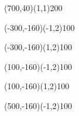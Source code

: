 \documentclass[12pt]{article}
\begin{document}
\begin{figure}[htb]
\begin{egame}
\putbranch(700,40)(1,1){200}

\renewcommand{\egarrowstyle}{e}

\putbranch(-300,-160)(-1,2){100}

\renewcommand{\egarrowstyle}{}

\putbranch(-300,-160)(1,2){100}

\renewcommand{\egarrowstyle}{e}

\putbranch(100,-160)(-1,2){100}

\renewcommand{\egarrowstyle}{}

\putbranch(100,-160)(1,2){100}

\renewcommand{\egarrowstyle}{}

\putbranch(500,-160)(-1,2){100}

\renewcommand{\egarrowstyle}{e}


\end{egame}
\end{figure}
\end{document}
